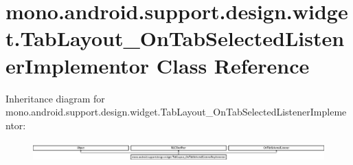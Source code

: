 \hypertarget{classmono_1_1android_1_1support_1_1design_1_1widget_1_1TabLayout__OnTabSelectedListenerImplementor}{}\section{mono.\+android.\+support.\+design.\+widget.\+Tab\+Layout\+\_\+\+On\+Tab\+Selected\+Listener\+Implementor Class Reference}
\label{classmono_1_1android_1_1support_1_1design_1_1widget_1_1TabLayout__OnTabSelectedListenerImplementor}
Inheritance diagram for mono.\+android.\+support.\+design.\+widget.\+Tab\+Layout\+\_\+\+On\+Tab\+Selected\+Listener\+Implementor\+:\begin{figure}[H]
\begin{center}
\leavevmode
\includegraphics[height=0.757268cm]{classmono_1_1android_1_1support_1_1design_1_1widget_1_1TabLayout__OnTabSelectedListenerImplementor}
\end{center}
\end{figure}
